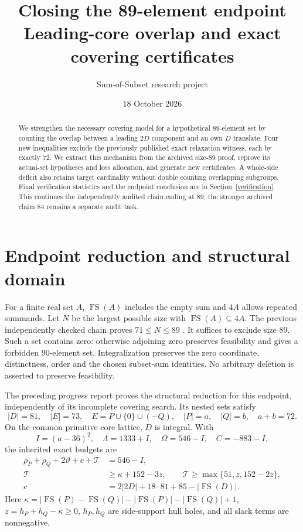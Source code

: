 \documentclass[11pt,a4paper]{article}
\title{Closing the 89-element endpoint\\\large Leading-core overlap and exact covering certificates}
\author{Sum-of-Subset research project}\date{18 October 2026}
\newcommand{\FS}{\operatorname{FS}}\newcommand{\Z}{\mathbb Z}
\newcommand{\T}{\mathcal T}
\begin{document}
\maketitle
\begin{abstract}
We strengthen the necessary covering model for a hypothetical 89-element
set by counting the overlap between a leading $2D$ component and an own
$D$ translate. Four new inequalities exclude the previously published
exact relaxation witness, each by exactly 72.
We extract this mechanism from the archived size-89 proof, reprove its
actual-set hypotheses and loss allocation, and generate new certificates.
A whole-side deficit also retains target cardinality without double
counting overlapping subgroups. Final verification statistics and the
endpoint conclusion are in Section~\ref{verification}.
This continues the independently audited chain ending at 89; the
stronger archived claim 84 remains a separate audit task.
\end{abstract}

\section{Endpoint reduction and structural domain}
For a finite real set $A$, $\FS(A)$ includes the empty sum and $4A$
allows repeated summands. Let $N$ be the largest possible size with
$\FS(A)\subseteq4A$. The previous independently checked chain proves
$71\le N\le89$ \cite{bound89,audit}. It suffices to exclude size 89.
Such a set contains zero: otherwise adjoining zero preserves feasibility
and gives a forbidden 90-element set. Integralization preserves the zero
coordinate, distinctness, order and the chosen subset-sum identities.
No arbitrary deletion is asserted to preserve feasibility.

The preceding progress report \cite{progress} proves the structural
reduction for this endpoint, independently of its incomplete covering
search. Its nested sets satisfy
\[
 |D|=81,\quad |E|=73,\quad E=P\cup\{0\}\cup(-Q),\quad
 |P|=a,\quad |Q|=b,\quad a+b=72.
\]
On the common primitive core lattice, $D$ is integral. With
\[
 I=(a-36)^2,\quad\Lambda=1333+I,\quad
 \Omega=546-I,\quad C=-883-I,
\]
the inherited exact budgets are
\begin{align}
 \rho_P+\rho_Q+2\vartheta+c+\T&=546-I,\label{budget}\\
 \T&\ge\kappa+152-3z,\qquad
 \T\ge\max\{51,z,152-2z\},\label{sharp}\\
 c&=2|2D|+18\cdot81+85-|\FS(D)|.\label{cdef}
\end{align}
Here $\kappa=|\FS(P)-\FS(Q)|-|\FS(P)|-|\FS(Q)|+1$,
$z=h_P+h_Q-\kappa\ge0$, $h_P,h_Q$ are side-support hull holes,
and all slack terms are nonnegative.
\end{document}
